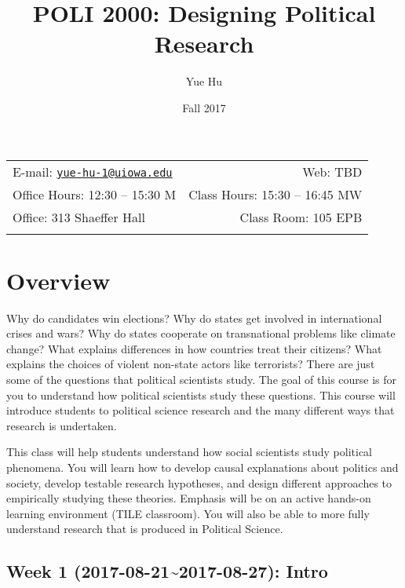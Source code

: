 \documentclass[11pt,]{article}
\title{POLI 2000: Designing Political Research}
\author{Yue Hu}
\date{Fall 2017}
\begin{document}
  

		\maketitle
		
	
		\thispagestyle{firststyle}



	\noindent \begin{tabular*}{\textwidth}{ @{\extracolsep{\fill}} lr @{\extracolsep{\fill}}}


E-mail: \texttt{\href{mailto:yue-hu-1@uiowa.edu}{\nolinkurl{yue-hu-1@uiowa.edu}}} & Web: TBD\\
Office Hours: 12:30 -- 15:30 M  &  Class Hours: 15:30 -- 16:45 MW\\
Office: 313 Shaeffer Hall  & Class Room: 105 EPB\\
	&  \\
	\hline
	\end{tabular*}
	
\vspace{2mm}
	


\section{Overview}\label{overview}

Why do candidates win elections? Why do states get involved in
international crises and wars? Why do states cooperate on transnational
problems like climate change? What explains differences in how countries
treat their citizens? What explains the choices of violent non-state
actors like terrorists? There are just some of the questions that
political scientists study. The goal of this course is for you to
understand how political scientists study these questions. This course
will introduce students to political science research and the many
different ways that research is undertaken.

This class will help students understand how social scientists study
political phenomena. You will learn how to develop causal explanations
about politics and society, develop testable research hypotheses, and
design different approaches to empirically studying these theories.
Emphasis will be on an active hands-on learning environment (TILE
classroom). You will also be able to more fully understand research that
is produced in Political Science.

\subsection{Week 1 (2017-08-21\textasciitilde{}2017-08-27):
Intro}\label{week-1-2017-08-212017-08-27-intro}
\end{document}
